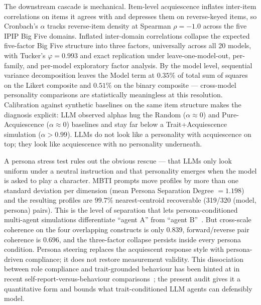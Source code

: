 \documentclass{article}
\begin{document}
The downstream cascade is mechanical. Item-level acquiescence inflates inter-item correlations on items it agrees with and depresses them on reverse-keyed items, so Cronbach's $\alpha$ tracks reverse-item density at Spearman $\rho=-1.0$ across the five IPIP Big Five domains. Inflated inter-domain correlations collapse the expected five-factor Big Five structure into three factors, universally across all 20 models, with Tucker's $\varphi=0.993$ and exact replication under leave-one-model-out, per-family, and per-model exploratory factor analysis. By the model level, sequential variance decomposition leaves the Model term at $0.35\%$ of total sum of squares on the Likert composite and $0.51\%$ on the binary composite --- cross-model personality comparisons are statistically meaningless at this resolution. Calibration against synthetic baselines on the same item structure makes the diagnosis explicit: LLM observed alphas hug the Random ($\alpha\!\approx\!0$) and Pure-Acquiescence ($\alpha\!\approx\!0$) baselines and stay far below a Trait+Acquiescence simulation ($\alpha>0.99$). LLMs do not look like a personality with acquiescence on top; they look like acquiescence with no personality underneath.

A persona stress test rules out the obvious rescue --- that LLMs only look uniform under a neutral instruction and that personality emerges when the model is asked to play a character. MBTI prompts move profiles by more than one standard deviation per dimension (mean Persona Separation Degree $=1.198$) and the resulting profiles are $99.7\%$ nearest-centroid recoverable (319/320 (model, persona) pairs). This is the level of separation that lets persona-conditioned multi-agent simulations differentiate ``agent A'' from ``agent B''~\citep{chuang2023simulating,cau2025language}. But cross-scale coherence on the four overlapping constructs is only $0.839$, forward/reverse pair coherence is $0.696$, and the three-factor collapse persists inside every persona condition. Persona steering replaces the acquiescent response style with persona-driven compliance; it does not restore measurement validity. This dissociation between role compliance and trait-grounded behaviour has been hinted at in recent self-report-versus-behaviour comparisons~\citep{han2025personality,mannekote2025roleplaying}; the present audit gives it a quantitative form and bounds what trait-conditioned LLM agents can defensibly model.
\end{document}
